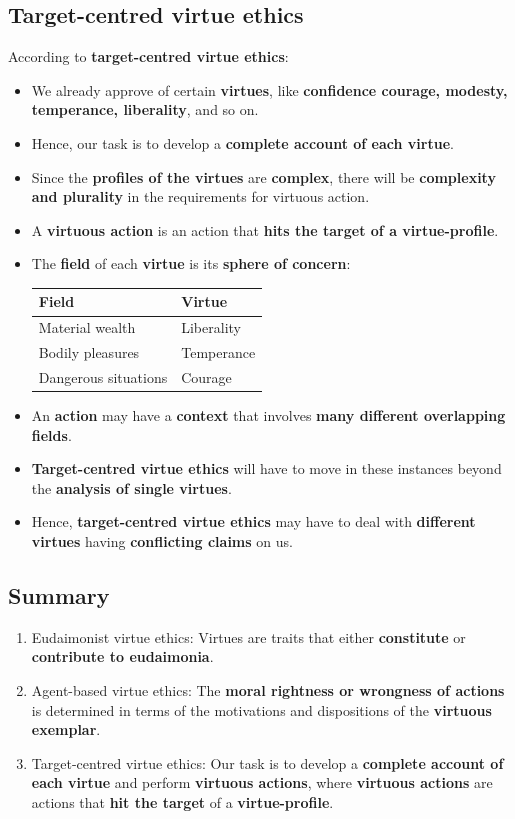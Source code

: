 \documentclass[11pt]{article}
\begin{document}
\subsection{Target-centred virtue ethics}
\label{sec:orge9e9333}
According to \textbf{target-centred virtue ethics}:
\begin{itemize}
\item We already approve of certain \textbf{virtues}, like \textbf{confidence courage, modesty, temperance, liberality}, and so on.
\item Hence, our task is to develop a \textbf{complete account of each virtue}.
\item Since the \textbf{profiles of the virtues} are \textbf{complex}, there will be \textbf{complexity and plurality} in the requirements for virtuous action.
\item A \textbf{virtuous action} is an action that \textbf{hits the target of a virtue-profile}.
\item The \textbf{field} of each \textbf{virtue} is its \textbf{sphere of concern}:
\begin{center}
\begin{tabularx}{\textwidth}{X|X}
Field & Virtue\\
\hline
Material wealth & Liberality\\
Bodily pleasures & Temperance\\
Dangerous situations & Courage\\
\end{tabularx}
\end{center}
\item An \textbf{action} may have a \textbf{context} that involves \textbf{many different overlapping fields}.
\item \textbf{Target-centred virtue ethics} will have to move in these instances beyond the \textbf{analysis of single virtues}.
\item Hence, \textbf{target-centred virtue ethics} may have to deal with \textbf{different virtues} having \textbf{conflicting claims} on us.
\end{itemize}
\subsection{Summary}
\label{sec:orgbacca00}
\begin{enumerate}
\item Eudaimonist virtue ethics:
Virtues are traits that either \textbf{constitute} or \textbf{contribute to eudaimonia}.
\item Agent-based virtue ethics:
The \textbf{moral rightness or wrongness of actions} is determined in terms of the motivations and dispositions of the \textbf{virtuous exemplar}.
\item Target-centred virtue ethics:
Our task is to develop a \textbf{complete account of each virtue} and perform \textbf{virtuous actions}, where \textbf{virtuous actions} are actions that \textbf{hit the target} of a \textbf{virtue-profile}.
\end{enumerate}
\end{document}
